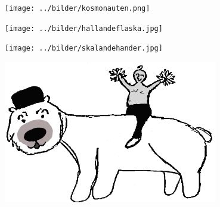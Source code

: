 \sclearpage

\sclearpage




%
\sclearpage


\sclearpage


\sclearpage

\sclearpage

\begin{intersong}
\begin{center}
\texttt{[image: ../bilder/kosmonauten.png]} 
\end{center}
\vspace{10mm}
\end{intersong}

\sclearpage
\sclearpage


\sclearpage

\sclearpage

\begin{intersong}
\begin{center}
\texttt{[image: ../bilder/hallandeflaska.jpg]} 
\end{center}
\end{intersong}
\sclearpage





\sclearpage

\sclearpage

\begin{intersong}
	\begin{center}
		\texttt{[image: ../bilder/skalandehander.jpg]} 
	\end{center}
\end{intersong}
\sclearpage

\begin{intersong}
	\begin{center}
		\includegraphics[width=0.7\textwidth]{../bilder/fardigabilder/CamillasFardigaBilder/Isbjorn2.png} 
	\end{center}
	\vspace{5mm}
\end{intersong}

